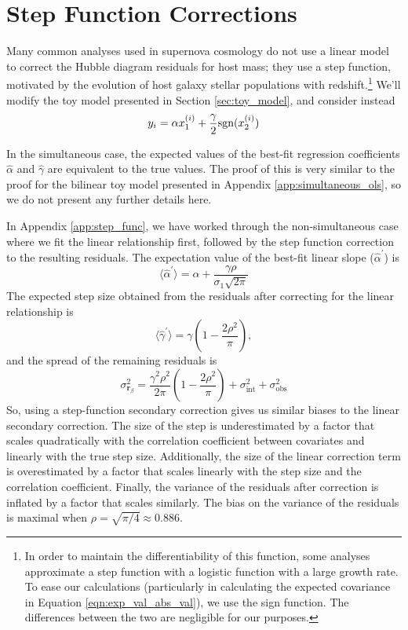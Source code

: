 \section{Step Function Corrections}
\label{sec:add_step}
Many common analyses used in supernova cosmology do not use a linear model to correct the Hubble diagram residuals for host mass; they use a step function, motivated by the evolution of host galaxy stellar populations with redshift.\footnote{In order to maintain the differentiability of this function, some analyses approximate a step function with a logistic function with a large growth rate.  To ease our calculations (particularly in calculating the expected covariance in Equation \ref{eqn:exp_val_abs_val}), we use the sign function. The differences between the two are negligible for our purposes.} We'll modify the toy model presented in Section \ref{sec:toy_model}, and consider instead
\begin{equation}
    y_i = \alpha x_1^{(i)} + \frac{\gamma}{2}\text{sgn}(x_2^{(i)})
\label{eqn:linear_and_step}
\end{equation}

In the simultaneous case, the expected values of the best-fit regression coefficients $\hat{\alpha}$ and $\hat{\gamma}$ are equivalent to the true values. The proof of this is very similar to the proof for the bilinear toy model presented in Appendix \ref{app:simultaneous_ols}, so we do not present any further details here.

In Appendix \ref{app:step_func}, we have worked through the non-simultaneous case where we fit the linear relationship first, followed by the step function correction to the resulting residuals. The expectation value of the best-fit linear slope ($\hat{\alpha}^\prime$) is
\begin{equation}
    \langle\hat{\alpha}^\prime\rangle = \alpha + \frac{\gamma\rho}{\sigma_1\sqrt{2\pi}}
    \label{eqn:slope_inflation}
\end{equation}
The expected step size obtained from the residuals after correcting for the linear relationship is
\begin{equation}
    \langle\hat{\gamma}^\prime\rangle = \gamma\left(1 - \frac{2\rho^2}{\pi}\right),
    \label{eqn:step_deflation}
\end{equation}
and the spread of the remaining residuals is
\begin{equation}
    \sigma_{\bm{r}_\beta}^2 = \frac{\gamma^2\rho^2}{2\pi}\left(1-\frac{2\rho^2}{\pi}\right) + \sigma_\text{int}^2 + \sigma_\text{obs}^2
\end{equation}
So, using a step-function secondary correction gives us similar biases to the linear secondary correction. The size of the step is underestimated by a factor that scales quadratically with the correlation coefficient between covariates and linearly with the true step size. Additionally, the size of the linear correction term is overestimated by a factor that scales linearly with the step size and the correlation coefficient. Finally, the variance of the residuals after correction is inflated by a factor that scales similarly. The bias on the variance of the residuals is maximal when $\rho=\sqrt{\pi/4}\approx 0.886$.

